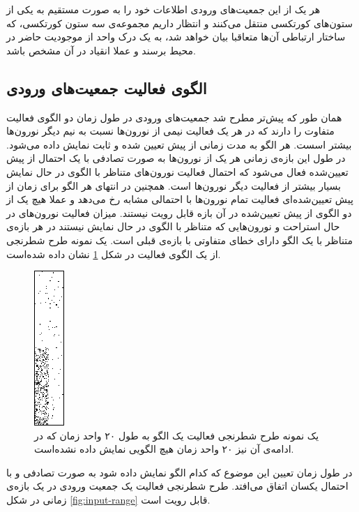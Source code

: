 \documentclass[12pt]{report}
\begin{document}
	هر یک از این جمعیت‌های ورودی اطلاعات خود‌ را به صورت مستقیم به یکی از ستون‌های کورتکسی منتقل می‌کنند و  انتظار داریم مجموعه‌ی سه ستون کورتکسی، که ساختار ارتباطی آن‌ها متعاقبا بیان خواهد شد، به یک درک واحد از موجودیت حاضر در محیط برسند و عملا انقیاد در آن مشخص باشد.
	
	
	\subsection{الگوی فعالیت جمعیت‌های ورودی}
	
	همان طور که پیش‌تر مطرح شد جمعیت‌های ورودی در طول زمان دو الگوی فعالیت متفاوت را دارند که در هر‌ یک فعالیت نیمی از نورون‌ها نسبت به نیم دیگر نورون‌ها بیشتر اسست. هر الگو به مدت زمانی از پیش تعیین شده و ثابت نمایش داده می‌شود. در طول این بازه‌ی زمانی هر یک از نورون‌ها به صورت تصادفی با یک احتمال از پیش تعیین‌شده فعال می‌شود که احتمال فعالیت نورون‌های متناظر با الگوی در حال نمایش بسیار بیشتر از فعالیت دیگر نورون‌ها است. همچنین در انتهای هر الگو برای زمان از پیش تعیین‌شده‌ای فعالیت تمام نورون‌ها با احتمالی مشابه رخ می‌دهد  و عملا هیچ یک از دو الگوی از پیش تعیین‌شده در آن بازه قابل رویت نیستند. میزان فعالیت نورون‌های در حال استراحت و نورون‌هایی که متناظر با الگوی در حال نمایش نیستند در هر بازه‌ی متناظر با یک الگو دارای خطای متفاوتی با بازه‌ی قبلی است. یک نمونه طرح شطرنجی از یک الگوی فعالیت در شکل \ref{fig:input-single} نشان داده شده‌است.
	
\begin{figure}[H]
	\centering
	\includegraphics[width=0.1\linewidth]{input-single.png}
	\caption[NS]{
		یک نمونه طرح شطرنجی فعالیت یک الگو به طول ۲۰ واحد زمان که در ادامه‌ی آن نیز ۲۰ واحد زمان هیچ الگویی نمایش داده نشده‌است.
	}
	\label{fig:input-single} 
\end{figure}
	
	در طول زمان تعیین این موضوع که کدام الگو نمایش داده شود به صورت تصادفی و با احتمال یکسان اتفاق می‌افتد. طرح شطرنجی فعالیت یک جمعیت ورودی در یک بازه‌ی زمانی در شکل \ref{fig:input-range} قابل رویت است.
	
\end{document}
